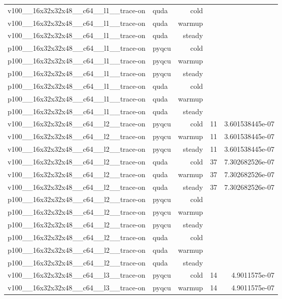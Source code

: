 \begin{table}[htbp]
\begin{tabular}{@{}llrrr@{}}
v100\_\_16x32x32x48\_\_c64\_\_l1\_\_trace-on & quda & cold &  &  \\
v100\_\_16x32x32x48\_\_c64\_\_l1\_\_trace-on & quda & warmup &  &  \\
v100\_\_16x32x32x48\_\_c64\_\_l1\_\_trace-on & quda & steady &  &  \\
p100\_\_16x32x32x48\_\_c64\_\_l1\_\_trace-on & pyqcu & cold &  &  \\
p100\_\_16x32x32x48\_\_c64\_\_l1\_\_trace-on & pyqcu & warmup &  &  \\
p100\_\_16x32x32x48\_\_c64\_\_l1\_\_trace-on & pyqcu & steady &  &  \\
p100\_\_16x32x32x48\_\_c64\_\_l1\_\_trace-on & quda & cold &  &  \\
p100\_\_16x32x32x48\_\_c64\_\_l1\_\_trace-on & quda & warmup &  &  \\
p100\_\_16x32x32x48\_\_c64\_\_l1\_\_trace-on & quda & steady &  &  \\
v100\_\_16x32x32x48\_\_c64\_\_l2\_\_trace-on & pyqcu & cold & 11 & 3.601538445e-07 \\
v100\_\_16x32x32x48\_\_c64\_\_l2\_\_trace-on & pyqcu & warmup & 11 & 3.601538445e-07 \\
v100\_\_16x32x32x48\_\_c64\_\_l2\_\_trace-on & pyqcu & steady & 11 & 3.601538445e-07 \\
v100\_\_16x32x32x48\_\_c64\_\_l2\_\_trace-on & quda & cold & 37 & 7.302682526e-07 \\
v100\_\_16x32x32x48\_\_c64\_\_l2\_\_trace-on & quda & warmup & 37 & 7.302682526e-07 \\
v100\_\_16x32x32x48\_\_c64\_\_l2\_\_trace-on & quda & steady & 37 & 7.302682526e-07 \\
p100\_\_16x32x32x48\_\_c64\_\_l2\_\_trace-on & pyqcu & cold &  &  \\
p100\_\_16x32x32x48\_\_c64\_\_l2\_\_trace-on & pyqcu & warmup &  &  \\
p100\_\_16x32x32x48\_\_c64\_\_l2\_\_trace-on & pyqcu & steady &  &  \\
p100\_\_16x32x32x48\_\_c64\_\_l2\_\_trace-on & quda & cold &  &  \\
p100\_\_16x32x32x48\_\_c64\_\_l2\_\_trace-on & quda & warmup &  &  \\
p100\_\_16x32x32x48\_\_c64\_\_l2\_\_trace-on & quda & steady &  &  \\
v100\_\_16x32x32x48\_\_c64\_\_l3\_\_trace-on & pyqcu & cold & 14 & 4.9011575e-07 \\
v100\_\_16x32x32x48\_\_c64\_\_l3\_\_trace-on & pyqcu & warmup & 14 & 4.9011575e-07 \\

\end{tabular}
\end{table}
